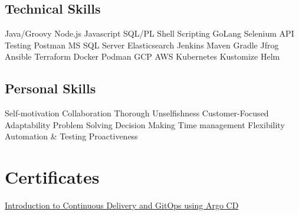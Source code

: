 \documentclass[]{resume}
\begin{document}
\begin{minipage}[t]{0.33\textwidth}
\subsection{Technical Skills}
\textbullet{}Java/Groovy
\textbullet{}Node.js
\textbullet{}Javascript
\textbullet{}SQL/PL
\textbullet{}Shell Scripting
\textbullet{}GoLang
\textbullet{}Selenium
\textbullet{}API Testing
\textbullet{}Postman
\textbullet{}MS SQL Server
\textbullet{}Elasticsearch
\textbullet{}Jenkins
\textbullet{}Maven
\textbullet{}Gradle
\textbullet{}Jfrog
\textbullet{}Ansible
\textbullet{}Terraform
\textbullet{}Docker
\textbullet{}Podman
\textbullet{}GCP
\textbullet{}AWS
\textbullet{}Kubernetes
\textbullet{}Kustomize
\textbullet{}Helm
\sectionsep
\subsection{Personal Skills}
\textbullet{}Self-motivation
\textbullet{}Collaboration
\textbullet{}Thorough
\textbullet{}Unselfishness
\textbullet{}Customer-Focused
\textbullet{}Adaptability
\textbullet{}Problem Solving
\textbullet{}Decision Making
\textbullet{}Time management
\textbullet{}Flexibility
\textbullet{}Automation \& Testing
\textbullet{}Proactiveness
\sectionsep


\section{Certificates}
\textbullet{} \href{https://www.credential.net/8b88c3fc-9afd-4848-8e1b-8080624c0163}{Introduction to Continuous Delivery and GitOps using Argo CD}
\sectionsep

%
%

\end{minipage} 
\hfill
\end{document}
